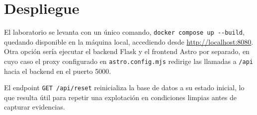 \section{Despliegue}

El laboratorio se levanta con un único comando, \verb|docker compose up --build|,
quedando disponible en la máquina local, accediendo desde \url{http://localhost:8080}. 
Otra opción sería ejecutar el backend Flask y el frontend Astro por separado, en
cuyo caso el proxy configurado en \texttt{astro.config.mjs} redirige las
llamadas a \texttt{/api} hacia el backend en el puerto 5000. 

El endpoint \verb|GET /api/reset| reinicializa la base de datos a su estado inicial, lo
que resulta útil para repetir una explotación en condiciones limpias antes
de capturar evidencias.
